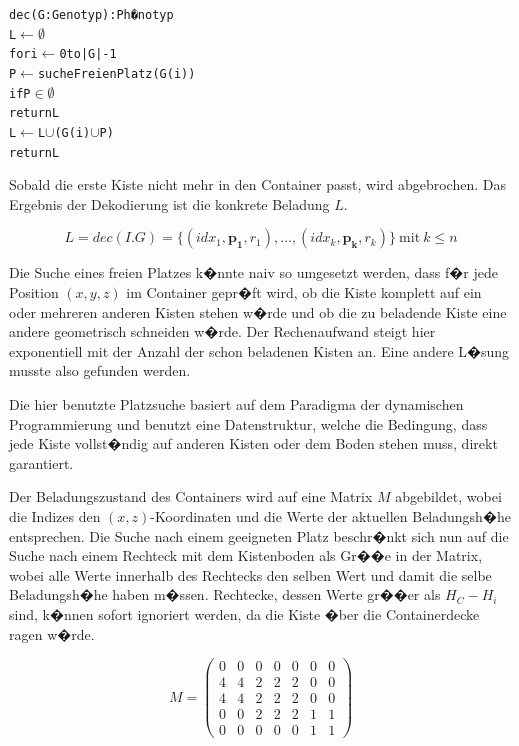 \documentclass[a4paper,abstracton,12pt]{scrartcl}
\begin{document}
\begin{alltt}
dec(G: Genotyp): Ph�notyp
  L \(\leftarrow\emptyset\)
  for i \(\leftarrow\) 0 to |G|-1
    P \(\leftarrow\) sucheFreienPlatz(G(i))
    if P \(\in\emptyset\)
      return L
    L \(\leftarrow\) L \(\cup\) (G(i) \(\cup\) P)
  return L
\end{alltt}

Sobald die erste Kiste nicht mehr in den Container passt, wird abgebrochen. Das Ergebnis der Dekodierung ist die konkrete Beladung $L$.

\begin{equation}
L = dec(I.G) = \{(idx_1,\mathbf{p_1},r_1),\ldots,(idx_k,\mathbf{p_k},r_k)\} \ \text{mit}\ k \le n
\end{equation}

Die Suche eines freien Platzes k�nnte naiv so umgesetzt werden, dass f�r jede Position $(x,y,z)$ im Container gepr�ft wird, ob die Kiste komplett auf ein oder mehreren anderen Kisten stehen w�rde und ob die zu beladende Kiste eine andere geometrisch schneiden w�rde. Der Rechenaufwand steigt hier exponentiell mit der Anzahl der schon beladenen Kisten an. Eine andere L�sung musste also gefunden werden.

Die hier benutzte Platzsuche basiert auf dem Paradigma der dynamischen Programmierung und benutzt eine Datenstruktur, welche die Bedingung, dass jede Kiste vollst�ndig auf anderen Kisten oder dem Boden stehen muss, direkt garantiert.

Der Beladungszustand des Containers wird auf eine Matrix $M$ abgebildet, wobei die Indizes den $(x,z)$-Koordinaten und die Werte der aktuellen Beladungsh�he entsprechen. Die Suche nach einem geeigneten Platz beschr�nkt sich nun auf die Suche nach einem Rechteck mit dem Kistenboden als Gr��e in der Matrix, wobei alle Werte innerhalb des Rechtecks den selben Wert und damit die selbe Beladungsh�he haben m�ssen. Rechtecke, dessen Werte gr��er als $H_C - H_i$ sind, k�nnen sofort ignoriert werden, da die Kiste �ber die Containerdecke ragen w�rde.

\begin{equation}
M = \begin{pmatrix}
0 & 0 & 0 & 0 & 0 & 0 & 0\\
4 & 4 & 2 & 2 & 2 & 0 & 0\\
4 & 4 & 2 & 2 & 2 & 0 & 0\\
0 & 0 & 2 & 2 & 2 & 1 & 1\\
0 & 0 & 0 & 0 & 0 & 1 & 1
\end{pmatrix}
\end{equation}
\end{document}

